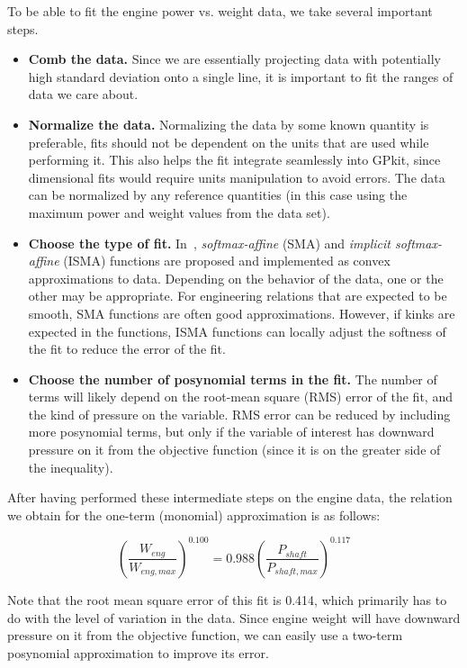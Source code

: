 To be able to fit the engine power vs. weight data, we take several important steps.
\begin{itemize}
    \item \textbf{Comb the data.} Since we are essentially projecting
    data with potentially high standard deviation onto a single line,
    it is important to fit the ranges of data we care about.
    \item \textbf{Normalize the data.} Normalizing the data
    by some known quantity is preferable, fits should not be dependent on the
    units that are used while performing it. This also helps the fit integrate
    seamlessly into GPkit, since dimensional fits would require units manipulation
    to avoid errors. The data can be normalized by any
    reference quantities (in this case using the maximum power and weight values
    from the data set).
    \item \textbf{Choose the type of fit.} In~\cite{gpfitpaper}, \textit{softmax-affine}
    (SMA) and \textit{implicit softmax-affine} (ISMA)
    functions are proposed and implemented as convex approximations
    to data. Depending on the behavior of the data, one or the other
    may be appropriate. For engineering relations that are expected to be smooth, SMA
    functions are often good approximations. However, if kinks are expected in the
    functions, ISMA functions can locally adjust the softness of the fit to
    reduce the error of the fit.
    \item \textbf{Choose the number of posynomial terms in the fit.} The number of
    terms will likely depend on the root-mean square (RMS) error of the fit, and
    the kind of pressure on the variable. RMS error can be reduced by including
    more posynomial terms, but only if the variable of interest has downward
    pressure on it from the objective function (since it is on the greater side
    of the inequality).
\end{itemize}

After having performed these intermediate steps on the engine data,
the relation we obtain for the one-term (monomial) approximation is as follows:

\begin{equation}
    \left(\frac{W_{eng}}{W_{eng,max}}\right)^{0.100} = 0.988 \left(\frac{P_{shaft}}{P_{shaft,max}}\right)^{0.117}
\end{equation}

Note that the root mean square error of this fit is 0.414, which primarily has to do with
the level of variation in the data. Since engine weight will have downward pressure
on it from the objective function, we can easily use a two-term posynomial approximation to
improve its error.

